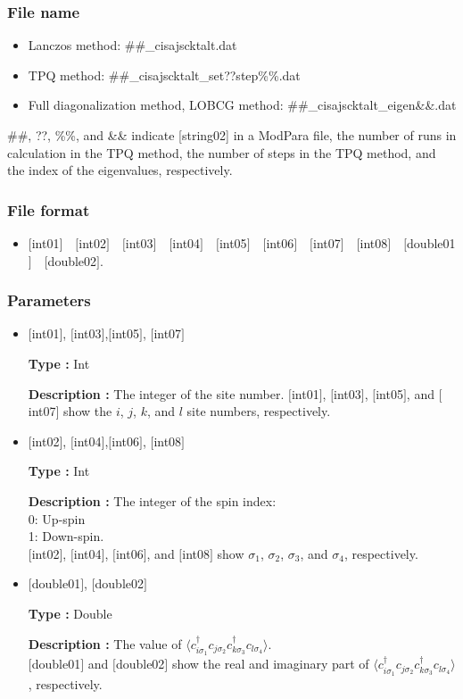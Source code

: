 \subsubsection{File name}
 \begin{itemize}
   \item{Lanczos method:}  \#\#\_cisajscktalt.dat
   \item{TPQ method:} \#\#\_cisajscktalt\_set??step\%\%.dat
   \item{Full diagonalization method, LOBCG method:}  \#\#\_cisajscktalt\_eigen{\&\&}.dat
  \end{itemize}
  \#\#, ??, \%\%, and \&\& indicate [string02] in a ModPara file, the number of runs in calculation in the TPQ method, the number of steps in the TPQ method, and the index of the eigenvalues, respectively.


\subsubsection{File format}
 \begin{itemize}
   \item  $[$int01$]$~~$[$int02$]$~~$[$int03$]$~~$[$int04$]$~~$[$int05$]$~~$[$int06$]$~~$[$int07$]$~~$[$int08$]$~~$[$double01$]$~~$[$double02$]$.
  \end{itemize}


\subsubsection{Parameters}
 \begin{itemize}

 \item  $[$int01$]$, $[$int03$]$,$[$int05$]$, $[$int07$]$

 {\bf Type :} Int

{\bf Description :} 
The integer of the site number. $[$int01$]$, $[$int03$]$, $[$int05$]$, and $[$int07$]$  show the $i$, $j$, $k$, and $l$ site numbers, respectively.
 
  \item  $[$int02$]$, $[$int04$]$,$[$int06$]$, $[$int08$]$

 {\bf Type :} Int 

{\bf Description :} The integer of the spin index:\\
   0: Up-spin\\
   1: Down-spin.\\ 
$[$int02$]$, $[$int04$]$, $[$int06$]$, and $[$int08$]$ show $\sigma_1$, $\sigma_2$, $\sigma_3$, and $\sigma_4$,  respectively. 

 \item  $[$double01$]$, $[$double02$]$

 {\bf Type :} Double 

{\bf Description :} The value of $\langle c_{i\sigma_1}^{\dagger}c_{j\sigma_2}c_{k\sigma_3}^{\dagger}c_{l\sigma_4}\rangle$.\\
$[$double01$]$ and $[$double02$]$ show the real and imaginary part of $\langle c_{i\sigma_1}^{\dagger}c_{j\sigma_2}c_{k\sigma_3}^{\dagger}c_{l\sigma_4}\rangle$, respectively.

\end{itemize}

